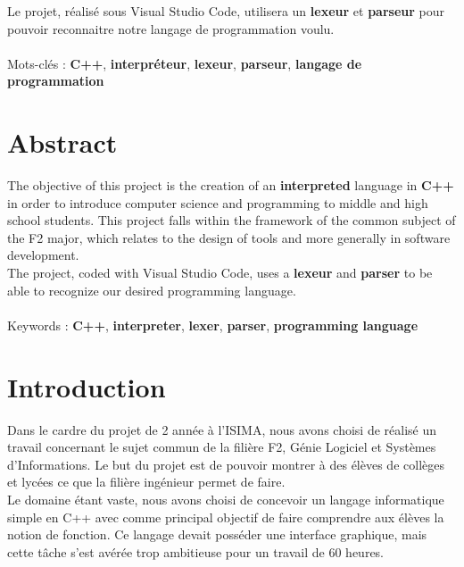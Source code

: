 \documentclass[a4paper]{article}%
\begin{document}
Le projet, réalisé sous Visual Studio Code, utilisera un \textbf{lexeur} et \textbf{parseur} pour pouvoir reconnaitre notre \textbf{}{langage de programmation} voulu.
\\~\\

\noindent
Mots-clés : \textbf{C++}, \textbf{interpréteur}, \textbf{lexeur}, \textbf{parseur},  \textbf{langage de programmation}
\\[2\baselineskip]

\section{Abstract}
The objective of this project is the creation of an \textbf{interpreted} language  in \textbf{C++} in order to introduce computer science and programming to middle and high school students. This project falls within the framework of the common subject of the F2 major, which relates to the design of tools and more generally in software development.\\

The project, coded with Visual Studio Code, uses a \textbf{lexeur} and \textbf{parser} to be able to recognize our desired \textbf{}{programming language}.
\\~\\

\noindent
Keywords : \textbf{C++}, \textbf{interpreter}, \textbf{lexer}, \textbf{parser},  \textbf{programming language}

\clearpage{}


\section{Introduction}
\large
Dans le cardre du projet de 2 année à l'ISIMA, nous avons choisi de réalisé un travail concernant le sujet commun de la filière F2, Génie Logiciel et Systèmes d'Informations. Le but du projet est de pouvoir montrer à des élèves de collèges et lycées ce que la filière ingénieur permet de faire.\\

Le domaine étant vaste, nous avons choisi de concevoir un langage informatique simple en C++ avec comme principal objectif de faire comprendre aux élèves la notion de fonction. Ce langage devait posséder une interface graphique, mais cette tâche s'est avérée trop ambitieuse pour un travail de 60 heures.\\
\end{document}

